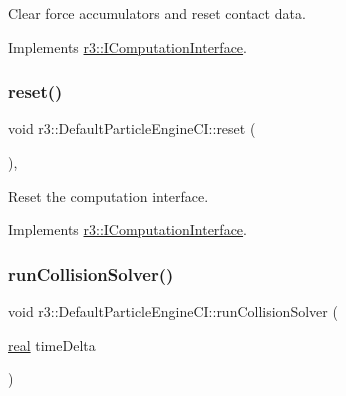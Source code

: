 Clear force accumulators and reset contact data. 



Implements \mbox{\hyperlink{classr3_1_1_i_computation_interface_acae0c5fada7e414c74fe6f5a8f4a6c7d}{r3\+::\+I\+Computation\+Interface}}.

\mbox{\label{classr3_1_1_default_particle_engine_c_i_a97757c62b4cb1266da29e2b5625bb9d3}} 
\subsubsection{\texorpdfstring{reset()}{reset()}}
{\footnotesize\ttfamily void r3\+::\+Default\+Particle\+Engine\+C\+I\+::reset (\begin{DoxyParamCaption}{ }\end{DoxyParamCaption})\hspace{0.3cm}{\ttfamily [override]}, {\ttfamily [virtual]}}



Reset the computation interface. 



Implements \mbox{\hyperlink{classr3_1_1_i_computation_interface_a6069989c54ffd4e714788d0968851007}{r3\+::\+I\+Computation\+Interface}}.

\mbox{\label{classr3_1_1_default_particle_engine_c_i_a19138f7707e948b7e8e05647bcba52fe}} 
\subsubsection{\texorpdfstring{run\+Collision\+Solver()}{runCollisionSolver()}}
{\footnotesize\ttfamily void r3\+::\+Default\+Particle\+Engine\+C\+I\+::run\+Collision\+Solver (\begin{DoxyParamCaption}\item[{\mbox{\hyperlink{namespacer3_ab2016b3e3f743fb735afce242f0dc1eb}{real}}}]{time\+Delta }\end{DoxyParamCaption})\hspace{0.3cm}{\ttfamily [protected]}}



